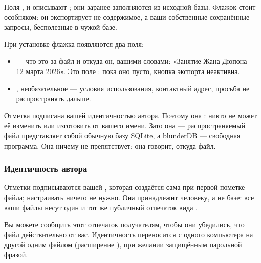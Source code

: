 \documentclass[letterpaper,10pt,russian]{sphinxmanual}
\begin{document}
\sphinxAtStartPar
Поля ,  и  описывают ; они заранее заполняются из исходной базы. Флажок  стоит особняком: он экспортирует не содержимое, а ваши собственные сохранённые запросы, бесполезные в чужой базе.

\sphinxAtStartPar
При установке флажка  появляются два поля:
\begin{itemize}
\item {} 
\sphinxAtStartPar
{} — что это за файл и откуда он, вашими словами: «Занятие Жана Дюпона — 12 марта 2026». Это поле : пока оно пусто, кнопка экспорта неактивна.

\item {} 
\sphinxAtStartPar
{}, необязательное — условия использования, контактный адрес, просьба не распространять дальше.

\end{itemize}

\sphinxAtStartPar
Отметка подписана вашей идентичностью автора. Поэтому она : никто не может её изменить или изготовить от вашего имени. Зато она  — распространяемый файл представляет собой обычную базу SQLite, а blunderDB — свободная программа. Она ничему не препятствует: она говорит, откуда файл.


\subsubsection{Идентичность автора}
\label{\detokenize{manuel:identite-d-emetteur}}
\sphinxAtStartPar
Отметки подписываются вашей , которая создаётся сама при первой пометке файла; настраивать ничего не нужно. Она принадлежит человеку, а не базе: все ваши файлы несут один и тот же публичный отпечаток вида .

\sphinxAtStartPar
Вы можете сообщить этот отпечаток получателям, чтобы они убедились, что файл действительно от вас. Идентичность переносится с одного компьютера на другой одним файлом (расширение ), при желании защищённым парольной фразой. 
\end{document}
